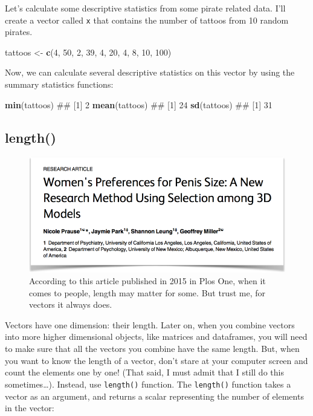 \documentclass[]{book}
\newenvironment{Shaded}{\begin{snugshade}}{\end{snugshade}}
\newcommand{\KeywordTok}[1]{\textcolor[rgb]{0.13,0.29,0.53}{\textbf{{#1}}}}
\newcommand{\DecValTok}[1]{\textcolor[rgb]{0.00,0.00,0.81}{{#1}}}
\newcommand{\StringTok}[1]{\textcolor[rgb]{0.31,0.60,0.02}{{#1}}}
\newcommand{\NormalTok}[1]{{#1}}
\theoremstyle{definition}
\theoremstyle{definition}
\theoremstyle{remark}
\begin{document}
Let's calculate some descriptive statistics from some pirate related
data. I'll create a vector called \texttt{x} that contains the number of
tattoos from 10 random pirates.

\begin{Shaded}
\begin{Highlighting}[]
\NormalTok{tattoos <-}\StringTok{ }\KeywordTok{c}\NormalTok{(}\DecValTok{4}\NormalTok{, }\DecValTok{50}\NormalTok{, }\DecValTok{2}\NormalTok{, }\DecValTok{39}\NormalTok{, }\DecValTok{4}\NormalTok{, }\DecValTok{20}\NormalTok{, }\DecValTok{4}\NormalTok{, }\DecValTok{8}\NormalTok{, }\DecValTok{10}\NormalTok{, }\DecValTok{100}\NormalTok{)}
\end{Highlighting}
\end{Shaded}

Now, we can calculate several descriptive statistics on this vector by
using the summary statistics functions:

\begin{Shaded}
\begin{Highlighting}[]
\KeywordTok{min}\NormalTok{(tattoos)}
\NormalTok{## [1] 2}
\KeywordTok{mean}\NormalTok{(tattoos)}
\NormalTok{## [1] 24}
\KeywordTok{sd}\NormalTok{(tattoos)}
\NormalTok{## [1] 31}
\end{Highlighting}
\end{Shaded}

\subsection{length()}\label{length}

\begin{figure}

{\centering \includegraphics[width=0.5\linewidth]{images/penissize} 

}

\caption{According to this article published in 2015 in Plos One, when it comes to people, length may matter for some. But trust me, for vectors it always does.}\label{fig:unnamed-chunk-121}
\end{figure}

Vectors have one dimension: their length. Later on, when you combine
vectors into more higher dimensional objects, like matrices and
dataframes, you will need to make sure that all the vectors you combine
have the same length. But, when you want to know the length of a vector,
don't stare at your computer screen and count the elements one by one!
(That said, I must admit that I still do this sometimes\ldots{}).
Instead, use \texttt{length()} function. The \texttt{length()} function
takes a vector as an argument, and returns a scalar representing the
number of elements in the vector:
\end{document}

